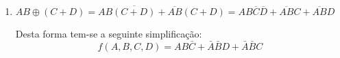 \documentclass{article}
\begin{document}
\begin{resolution}
\begin{enumerate}[label=(\alph*), rightmargin = \leftmargin]
                    \item $AB \oplus (C+D) = AB\overline{(C+D)} + \overline{AB}(C+D) = AB\overline{C}\overline{D} + \overline{AB}C + \overline{AB}D$
                        \begin{figure}[H]
                            \centering
                            \begin{karnaugh-map}[4][4][1][$A\;B$][$C\;D$]
                            \end{karnaugh-map}
                        \end{figure}\noindent
                    Desta forma tem-se a seguinte simplificação:
                        \begin{equation}
                            \boxed{
                                f(A,B,C,D) = AB\bar{C} + \bar{A}\bar{B}D + \bar{A}\bar{B}C
                            }
                        \end{equation}


\end{enumerate}
\end{resolution}
\end{document}
